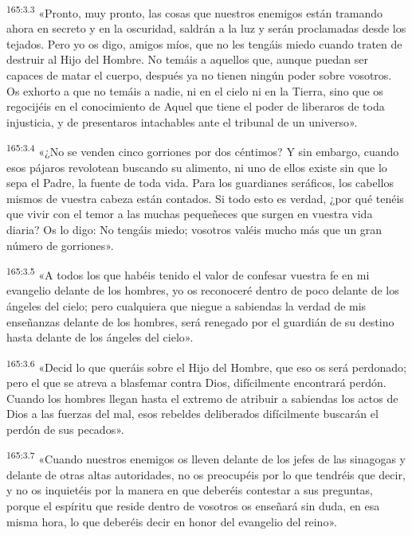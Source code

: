 \par 
\textsuperscript{165:3.3} «Pronto, muy pronto, las cosas que nuestros enemigos están tramando ahora en secreto y en la oscuridad, saldrán a la luz y serán proclamadas desde los tejados. Pero yo os digo, amigos míos, que no les tengáis miedo cuando traten de destruir al Hijo del Hombre. No temáis a aquellos que, aunque puedan ser capaces de matar el cuerpo, después ya no tienen ningún poder sobre vosotros. Os exhorto a que no temáis a nadie, ni en el cielo ni en la Tierra, sino que os regocijéis en el conocimiento de Aquel que tiene el poder de liberaros de toda injusticia, y de presentaros intachables ante el tribunal de un universo».

\par 
\textsuperscript{165:3.4} «¿No se venden cinco gorriones por dos céntimos? Y sin embargo, cuando esos pájaros revolotean buscando su alimento, ni uno de ellos existe sin que lo sepa el Padre, la fuente de toda vida. Para los guardianes seráficos, los cabellos mismos de vuestra cabeza están contados. Si todo esto es verdad, ¿por qué tenéis que vivir con el temor a las muchas pequeñeces que surgen en vuestra vida diaria? Os lo digo: No tengáis miedo; vosotros valéis mucho más que un gran número de gorriones».

\par 
\textsuperscript{165:3.5} «A todos los que habéis tenido el valor de confesar vuestra fe en mi evangelio delante de los hombres, yo os reconoceré dentro de poco delante de los ángeles del cielo; pero cualquiera que niegue a sabiendas la verdad de mis enseñanzas delante de los hombres, será renegado por el guardián de su destino hasta delante de los ángeles del cielo».

\par 
\textsuperscript{165:3.6} «Decid lo que queráis sobre el Hijo del Hombre, que eso os será perdonado; pero el que se atreva a blasfemar contra Dios, difícilmente encontrará perdón. Cuando los hombres llegan hasta el extremo de atribuir a sabiendas los actos de Dios a las fuerzas del mal, esos rebeldes deliberados difícilmente buscarán el perdón de sus pecados».

\par 
\textsuperscript{165:3.7} «Cuando nuestros enemigos os lleven delante de los jefes de las sinagogas y delante de otras altas autoridades, no os preocupéis por lo que tendréis que decir, y no os inquietéis por la manera en que deberéis contestar a sus preguntas, porque el espíritu que reside dentro de vosotros os enseñará sin duda, en esa misma hora, lo que deberéis decir en honor del evangelio del reino».

